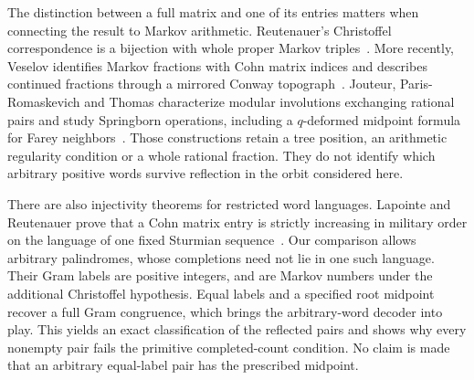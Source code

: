 The distinction between a full matrix and one of its entries matters
when connecting the result to Markov arithmetic. Reutenauer's
Christoffel correspondence is a bijection with whole proper Markov
triples~\cite[Theorem~1]{Reutenauer2009}. More recently, Veselov identifies
Markov fractions with Cohn matrix indices and describes continued
fractions through a mirrored Conway topograph~\cite[Sections~3--4]{Veselov2026}.
Jouteur, Paris-Romaskevich and Thomas characterize modular involutions
exchanging rational pairs and study Springborn operations, including a
$q$-deformed midpoint formula for Farey neighbors~\cite[Sections~5--7]{JouteurParisRomaskevichThomas2026}.
Those constructions retain a tree position, an arithmetic regularity
condition or a whole rational fraction. They do not identify which
arbitrary positive words survive reflection in the orbit considered here.

There are also injectivity theorems for restricted word languages.
Lapointe and Reutenauer prove that a Cohn matrix entry is strictly
increasing in military order on the language of one fixed Sturmian
sequence~\cite[Corollary~1]{LapointeReutenauer2021}. Our comparison allows
arbitrary palindromes, whose completions need not lie in one such
language. Their Gram labels are positive integers, and are Markov
numbers under the additional Christoffel hypothesis. Equal labels and a
specified root midpoint recover a full Gram congruence, which brings the
arbitrary-word decoder into play. This yields an exact classification of
the reflected pairs and shows why every nonempty pair fails the primitive
completed-count condition. No claim is made that an arbitrary equal-label
pair has the prescribed midpoint.
